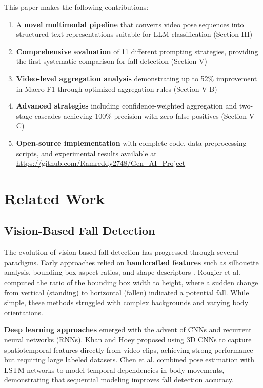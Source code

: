 \documentclass[conference]{IEEEtran}
\begin{document}
This paper makes the following contributions:
\begin{enumerate}[leftmargin=*]
    \item A \textbf{novel multimodal pipeline} that converts video pose sequences into structured text representations suitable for LLM classification (Section III)
    \item \textbf{Comprehensive evaluation} of 11 different prompting strategies, providing the first systematic comparison for fall detection (Section V)
    \item \textbf{Video-level aggregation analysis} demonstrating up to 52\% improvement in Macro F1 through optimized aggregation rules (Section V-B)
    \item \textbf{Advanced strategies} including confidence-weighted aggregation and two-stage cascades achieving 100\% precision with zero false positives (Section V-C)
    \item \textbf{Open-source implementation} with complete code, data preprocessing scripts, and experimental results available at \url{https://github.com/Ramreddy2748/Gen_AI_Project}
\end{enumerate}

\section{Related Work}

\subsection{Vision-Based Fall Detection}

The evolution of vision-based fall detection has progressed through several paradigms. Early approaches relied on \textbf{handcrafted features} such as silhouette analysis, bounding box aspect ratios, and shape descriptors \cite{rougier2011robust}. Rougier et al. computed the ratio of the bounding box width to height, where a sudden change from vertical (standing) to horizontal (fallen) indicated a potential fall. While simple, these methods struggled with complex backgrounds and varying body orientations.

\textbf{Deep learning approaches} emerged with the advent of CNNs and recurrent neural networks (RNNs). Khan and Hoey \cite{khan2020fall} proposed using 3D CNNs to capture spatiotemporal features directly from video clips, achieving strong performance but requiring large labeled datasets. Chen et al. \cite{chen2020fall} combined pose estimation with LSTM networks to model temporal dependencies in body movements, demonstrating that sequential modeling improves fall detection accuracy.
\end{document}
